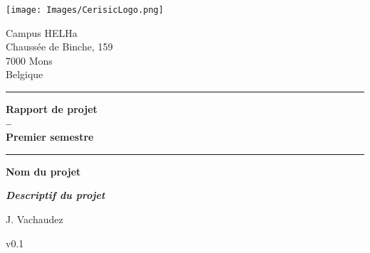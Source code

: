 
\begingroup
\thispagestyle{empty}

\vspace{2cm}
\begin{minipage}{0.47\textwidth}
	\begin{flushleft}
		\texttt{[image: Images/CerisicLogo.png]}
	\end{flushleft}
\end{minipage}
\hfill
\begin{minipage}{0.47\textwidth}
	\begin{flushright}
		Campus HELHa\\
		Chaussée de Binche, 159\\
		7000 Mons\\
		Belgique
	\end{flushright}
\end{minipage}
\vspace{5cm}


\begin{center}
\rule{\textwidth}{1pt}

	\begin{huge}
		\textbf{Rapport de projet \\\vspace{0.25cm} -- \\\vspace{0.25cm} Premier semestre}
	\end{huge}
\rule{\textwidth}{1pt}
\end{center}

\begin{flushright}
	\begin{Large}
		{\bf Nom du projet}
	\end{Large}

	\begin{large}
		{\bf \sl Descriptif du projet}
	\end{large}
\end{flushright}

\vspace{1cm}

\begin{flushright}
	\begin{Large}
		J. {\sc Vachaudez}\\
	\end{Large}
	v0.1
\end{flushright}

